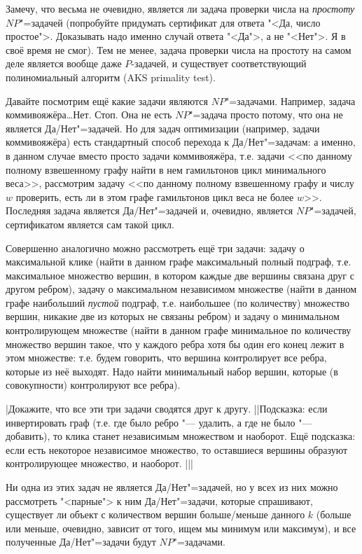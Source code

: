 {Замечу, что весьма не очевидно, является ли задача проверки числа на 
\textit{простоту} $NP$"=задачей (попробуйте придумать сертификат для ответа 
"<Да, число простое">. Доказывать надо именно случай ответа "<Да">, а не 
"<Нет">. Я в своё время не смог). 
Тем не менее, задача проверки числа на простоту на самом деле 
является вообще даже $P$-задачей,
и существует соответствующий полиномиальный алгоритм (AKS primality test).

Давайте посмотрим ещё какие задачи являются $NP$"=задачами. Например, задача 
коммивояжёра\dots Нет. Стоп. Она не есть $NP$"=задача просто потому, что она не 
является Да/Нет"=задачей. Но для задач оптимизации (например, задачи 
коммивояжёра) есть стандартный способ перехода к Да/Нет"=задачам: а именно, в 
данном случае вместо просто задачи коммивояжёра, т.е. задачи <<по данному полному 
взвешенному графу найти в нем гамильтонов цикл минимального веса>>, рассмотрим 
задачу <<по данному полному взвешенному графу и числу $w$ проверить, есть ли в 
этом графе гамильтонов цикл веса не более $w$>>. Последняя задача является 
Да/Нет"=задачей и, очевидно, является $NP$"=задачей, сертификатом является сам 
такой цикл.

Совершенно аналогично можно рассмотреть ещё три задачи: задачу о максимальной 
клике (найти в данном графе максимальный полный подграф, т.е. максимальное 
множество вершин, в котором каждые две вершины связана друг с другом ребром), задачу о 
максимальном независимом множестве (найти в данном графе наибольший 
\textit{пустой} подграф, т.е. наибольшее (по количеству) множество вершин, 
никакие две из которых не связаны ребром) и задачу о минимальном
контролирующем множестве (найти в данном графе минимальное по количеству 
множество вершин такое, что у каждого ребра хотя бы один его конец лежит в этом 
множестве: т.е. будем говорить, что вершина контролирует все ребра, которые из 
неё выходят. Надо найти минимальный набор вершин, которые (в совокупности) 
контролируют все ребра). 

\task|Докажите, что все эти три задачи сводятся друг к другу.
||Подсказка: если инвертировать 
граф (т.е. где было ребро "--- удалить, а где не было "--- добавить), то клика 
станет независимым множеством и наоборот. Ещё подсказка: если есть некоторое 
независимое множество, то оставшиеся вершины образуют контролирующее множество, 
и наоборот.
|||

Ни одна из этих задач не является Да/Нет"=задачей, но 
у всех из них можно рассмотреть "<парные"> к ним Да/Нет"=задачи, которые 
спрашивают, существует ли объект с количеством вершин больше/меньше данного $k$ 
(больше или меньше, очевидно, зависит от того, ищем мы минимум или максимум), и 
все полученные Да/Нет"=задачи будут $NP$"=задачами. 

}
